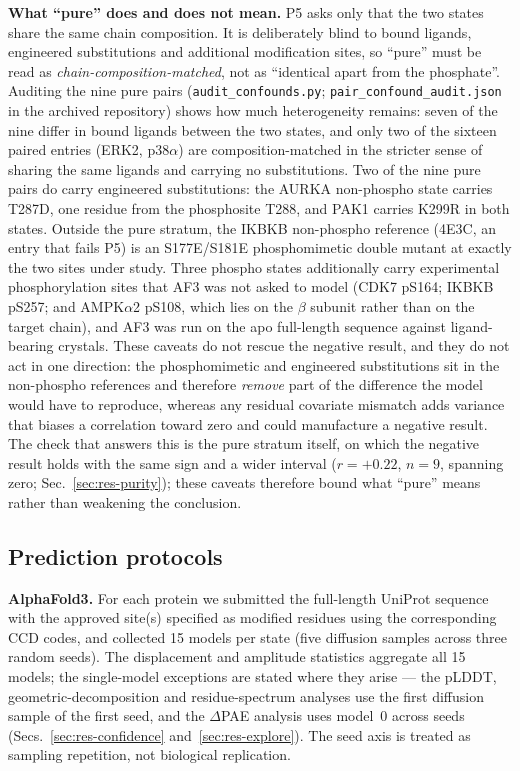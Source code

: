 \noindent\textbf{What ``pure'' does and does not mean.} P5 asks only that
the two states share the same chain composition. It is deliberately blind
to bound ligands, engineered substitutions and additional modification
sites, so ``pure'' must be read as \emph{chain-composition-matched}, not as
``identical apart from the phosphate''. Auditing the nine pure pairs
(\texttt{audit\_confounds.py};
\texttt{pair\_confound\_audit.json} in the archived repository) shows how
much heterogeneity remains: seven of the nine differ in bound ligands
between the two states, and only two of the sixteen paired entries
(ERK2, p38$\alpha$) are composition-matched in the stricter sense of
sharing the same ligands and carrying no substitutions. Two of the nine
pure pairs do carry engineered substitutions: the AURKA non-phospho state
carries T287D, one residue from the phosphosite T288, and PAK1 carries
K299R in both states. Outside the pure stratum, the IKBKB non-phospho
reference (4E3C, an entry that fails P5) is an S177E/S181E phosphomimetic
double mutant at exactly the two sites under study. Three phospho states
additionally carry experimental phosphorylation
sites that AF3 was not asked to model (CDK7 pS164; IKBKB pS257; and
AMPK$\alpha$2 pS108, which lies on the $\beta$ subunit rather than on the
target chain), and AF3 was run on the apo full-length sequence against
ligand-bearing crystals. These caveats do not rescue the negative
result, and they do not act in one direction: the phosphomimetic and
engineered substitutions sit in the non-phospho references and therefore
\emph{remove} part of the difference the model would have to reproduce,
whereas any residual covariate mismatch adds variance that biases a
correlation toward zero and could manufacture a negative result. The check
that answers this is the pure stratum itself, on which the negative result
holds with the same sign and a wider interval ($r=+0.22$, $n=9$, spanning
zero; Sec.~\ref{sec:res-purity}); these caveats therefore bound what
``pure'' means rather than weakening the conclusion.

\subsection{Prediction protocols}
\label{sec:predict}

\noindent\textbf{AlphaFold3.} For each protein we submitted the full-length
UniProt sequence with the approved site(s) specified as modified residues
using the corresponding CCD codes, and collected 15 models per state (five
diffusion samples across three random seeds). The displacement and
amplitude statistics aggregate all 15 models; the single-model exceptions
are stated where they arise --- the pLDDT, geometric-decomposition and
residue-spectrum analyses use the first diffusion sample of the first seed,
and the $\Delta$PAE analysis uses model~0 across seeds
(Secs.~\ref{sec:res-confidence} and~\ref{sec:res-explore}). The seed axis is
treated as sampling repetition, not biological replication.

